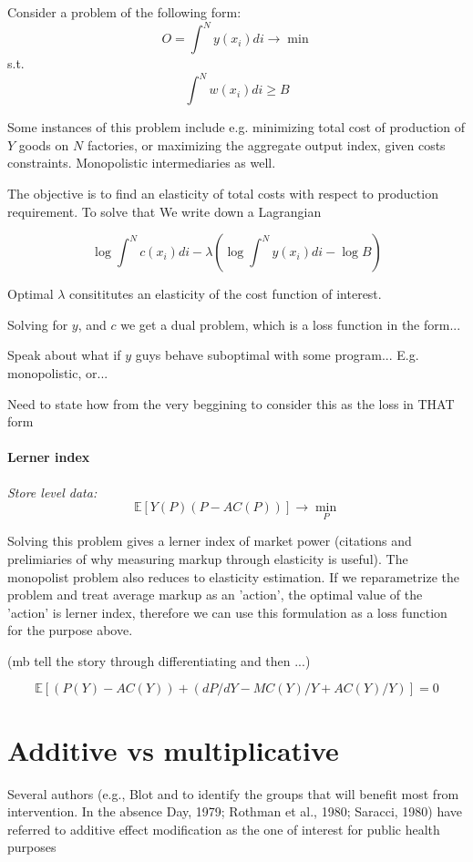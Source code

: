 \documentclass[a4paper,12pt]{article}
\theoremstyle{plain}
\begin{document}
Consider a problem of the following form:
$$O = \int^N y(x_i) di \to \min$$
s.t. $$\int^N w(x_i) di \geq B$$

Some instances of this problem include e.g. minimizing total cost of production of $Y$ goods on $N$ factories, or maximizing the aggregate output index, given costs constraints. Monopolistic intermediaries as well.

The objective is to find an elasticity of total costs with respect to production requirement. To solve that We write down a Lagrangian

$$\log\int^N c(x_i) di - \lambda(\log\int^N y(x_i) di - \log B)$$

Optimal $\lambda$ consititutes an elasticity of the cost function of interest.

Solving for $y$, and $c$ we get a dual problem, which is a loss function in the form...

Speak about what if $y$ guys behave suboptimal with some program... E.g. monopolistic, or... 

Need to state how from the very beggining to consider this as the loss in THAT form

\paragraph{Lerner index}

\textit{Store level data:}
$$\mathbb{E}[Y(P)(P - AC(P))] \to \min_P$$

Solving this problem gives a lerner index of market power (citations and prelimiaries of why measuring markup through elasticity is useful). The monopolist problem also reduces to elasticity estimation. If we reparametrize the problem and treat average markup as an 'action', the optimal value of the 'action' is lerner index, therefore we can use this formulation as a loss function for the purpose above.

(mb tell the story through differentiating and then ...)

$$\mathbb{E}[(P(Y) - AC(Y)) + (dP/dY - MC(Y)/Y + AC(Y)/Y)] = 0$$


\section{Additive vs multiplicative}

Several authors (e.g., Blot and to identify the groups that will benefit most from intervention. In the absence Day, 1979; Rothman et al., 1980; Saracci, 1980) have referred to additive effect modification as the one of interest for public health purposes
\end{document}
